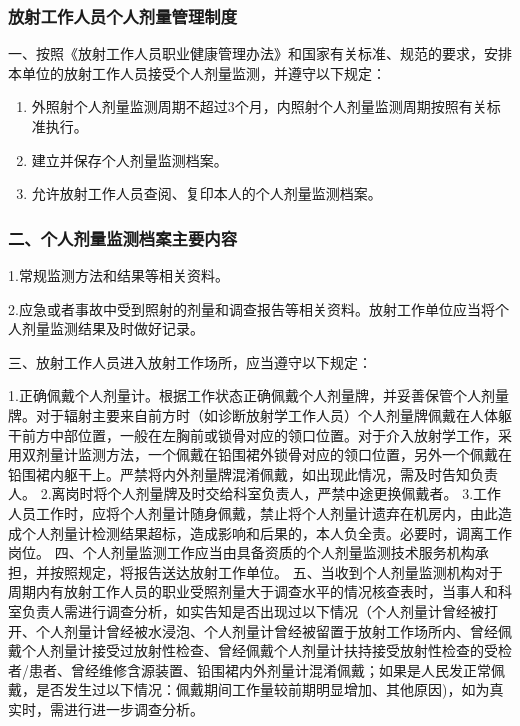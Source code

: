 \subsubsection{放射工作人员个人剂量管理制度}

一、按照《放射工作人员职业健康管理办法》和国家有关标准、规范的要求，安排本单位的放射工作人员接受个人剂量监测，并遵守以下规定：

\begin{enumerate}
\item 外照射个人剂量监测周期不超过3个月，内照射个人剂量监测周期按照有关标准执行。
\item 建立并保存个人剂量监测档案。
\item 允许放射工作人员查阅、复印本人的个人剂量监测档案。
\end{enumerate}

\subsubsection{二、个人剂量监测档案主要内容}

1.常规监测方法和结果等相关资料。

2.应急或者事故中受到照射的剂量和调查报告等相关资料。放射工作单位应当将个人剂量监测结果及时做好记录。

三、放射工作人员进入放射工作场所，应当遵守以下规定：

1.正确佩戴个人剂量计。根据工作状态正确佩戴个人剂量牌，并妥善保管个人剂量牌。对于辐射主要来自前方时（如诊断放射学工作人员）个人剂量牌佩戴在人体躯干前方中部位置，一般在左胸前或锁骨对应的领口位置。对于介入放射学工作，采用双剂量计监测方法，一个佩戴在铅围裙外锁骨对应的领口位置，另外一个佩戴在铅围裙内躯干上。严禁将内外剂量牌混淆佩戴，如出现此情况，需及时告知负责人。
2.离岗时将个人剂量牌及时交给科室负责人，严禁中途更换佩戴者。
3.工作人员工作时，应将个人剂量计随身佩戴，禁止将个人剂量计遗弃在机房内，由此造成个人剂量计检测结果超标，造成影响和后果的，本人负全责。必要时，调离工作岗位。
四、个人剂量监测工作应当由具备资质的个人剂量监测技术服务机构承担，并按照规定，将报告送达放射工作单位。
五、当收到个人剂量监测机构对于周期内有放射工作人员的职业受照剂量大于调查水平的情况核查表时，当事人和科室负责人需进行调查分析，如实告知是否出现过以下情况（个人剂量计曾经被打开、个人剂量计曾经被水浸泡、个人剂量计曾经被留置于放射工作场所内、曾经佩戴个人剂量计接受过放射性检查、曾经佩戴个人剂量计扶持接受放射性检查的受检者/患者、曾经维修含源装置、铅围裙内外剂量计混淆佩戴；如果是人民发正常佩戴，是否发生过以下情况：佩戴期间工作量较前期明显增加、其他原因)，如为真实时，需进行进一步调查分析。

